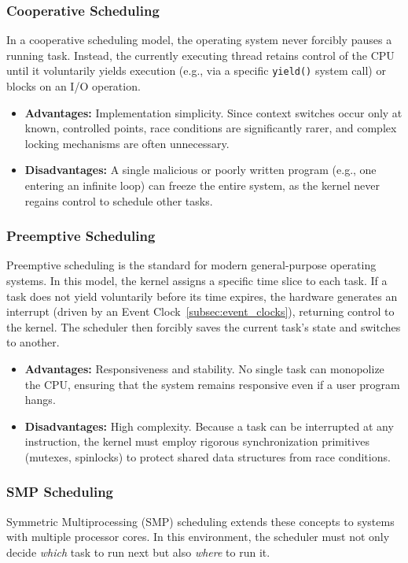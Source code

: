 \documentclass[a4paper,10pt,twoside]{report}
\theoremstyle{definition}
\begin{document}
\subsubsection{Cooperative Scheduling}
In a cooperative scheduling model, the operating system never forcibly pauses a running task. Instead, the currently executing thread retains control of the CPU until it voluntarily yields execution (e.g., via a specific \texttt{yield()} system call) or blocks on an I/O operation.

\begin{itemize}
    \item \textbf{Advantages:} Implementation simplicity. Since context switches occur only at known, controlled points, race conditions are significantly rarer, and complex locking mechanisms are often unnecessary. 
    \item \textbf{Disadvantages:} A single malicious or poorly written program (e.g., one entering an infinite loop) can freeze the entire system, as the kernel never regains control to schedule other tasks.
\end{itemize}

\subsubsection{Preemptive Scheduling}
Preemptive scheduling is the standard for modern general-purpose operating systems. In this model, the kernel assigns a specific time slice to each task. If a task does not yield voluntarily before its time expires, the hardware generates an interrupt (driven by an Event Clock~\ref{subsec:event_clocks}), returning control to the kernel. The scheduler then forcibly saves the current task's state and switches to another.

\begin{itemize}
    \item \textbf{Advantages:} Responsiveness and stability. No single task can monopolize the CPU, ensuring that the system remains responsive even if a user program hangs.
    \item \textbf{Disadvantages:} High complexity. Because a task can be interrupted at any instruction, the kernel must employ rigorous synchronization primitives (mutexes, spinlocks) to protect shared data structures from race conditions.
\end{itemize}

\subsubsection{SMP Scheduling}
Symmetric Multiprocessing (SMP) scheduling extends these concepts to systems with multiple processor cores. In this environment, the scheduler must not only decide \textit{which} task to run next but also \textit{where} to run it.
\end{document}
